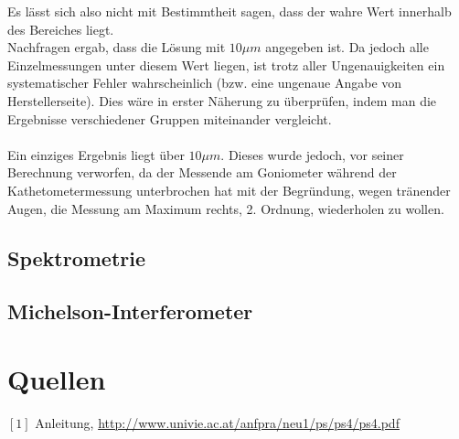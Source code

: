 \documentclass[12pt,a4paper]{article}
\begin{document}
\begin{multicols}{2}
Es lässt sich also nicht mit Bestimmtheit sagen, dass der wahre Wert innerhalb des Bereiches liegt.\\Nachfragen ergab, dass die Lösung mit $10 \mu m$ angegeben ist. Da jedoch alle Einzelmessungen unter diesem Wert liegen, ist trotz aller Ungenauigkeiten ein systematischer Fehler wahrscheinlich (bzw. eine ungenaue Angabe von Herstellerseite). Dies wäre in erster Näherung zu überprüfen, indem man die Ergebnisse verschiedener Gruppen miteinander vergleicht.\\
\\
Ein einziges Ergebnis liegt über $10\mu m$. Dieses wurde jedoch, vor seiner Berechnung verworfen, da der Messende am Goniometer während der Kathetometermessung unterbrochen hat mit der Begründung, wegen tränender Augen, die Messung am Maximum rechts, 2. Ordnung, wiederholen zu wollen.\\



\subsection{Spektrometrie}


\subsection{Michelson-Interferometer}


\section{Quellen}
$[1]$ Anleitung, \url{http://www.univie.ac.at/anfpra/neu1/ps/ps4/ps4.pdf}\\
\end{multicols}
\end{document}
